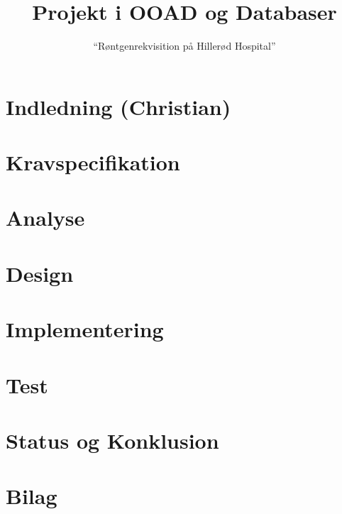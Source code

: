 \documentclass[11pt,a4paper]{article}  	%
\title{Projekt i OOAD og Databaser}
\author{“Røntgenrekvisition på Hillerød Hospital”}
\begin{document}
\normalfont


\newpage					%
\renewcommand{\figurename}{Figur}
\setcounter{figure}{0}
\tableofcontents
\newpage
\section*{Indledning (Christian)}


\newpage
\section{Kravspecifikation}


\newpage
\section{Analyse}


\newpage
\section{Design}


\newpage
\section{Implementering}


\newpage
\section{Test}


\newpage
\section{Status og Konklusion}


\newpage
{}

\newpage
\section{Bilag}

\end{document}
